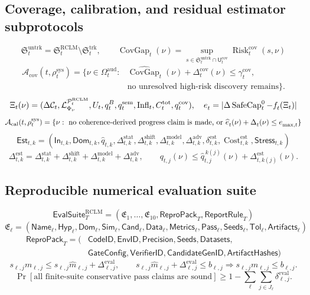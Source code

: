\documentclass[11pt,a4paper]{article}
\newcommand{\Ccal}{\mathcal C}
\newcommand{\Lcal}{\mathcal L}
\newcommand{\Pcal}{\mathcal P}
\newcommand{\Acal}{\mathcal A}
\newcommand{\calib}{\mathrm{cal}}
\newcommand{\adv}{\mathrm{adv}}
\newcommand{\shift}{\mathrm{shift}}
\newcommand{\RCLM}{\mathrm{RCLM}}
\newcommand{\sem}{\mathrm{sem}}
\newcommand{\sys}{\mathrm{sys}}
\newcommand{\aud}{\mathrm{aud}}
\newcommand{\SafeCap}{\operatorname{SafeCap}}
\newcommand{\Risk}{\operatorname{Risk}}
\newcommand{\Cost}{\operatorname{Cost}}
\newcommand{\tot}{\mathrm{tot}}
\newcommand{\eval}{\mathrm{eval}}
\newcommand{\stat}{\mathrm{stat}}
\newcommand{\model}{\mathrm{model}}
\newcommand{\cov}{\mathrm{cov}}
\newcommand{\trk}{\mathrm{trk}}
\newcommand{\untrk}{\mathrm{untrk}}
\newcommand{\est}{\mathrm{est}}
\begin{document}
\subsection*{Coverage, calibration, and residual estimator subprotocols}
\[
\mathfrak S_t^{\untrk}=\mathfrak S_t^{\RCLM}\setminus\mathfrak S_t^{\trk},
\qquad
\operatorname{CovGap}_t(\nu)=
\sup_{s\in\mathfrak S_t^{\untrk}\cap\mathsf U_t^{\cov}}
\Risk_t^{\cov}(s,\nu)
\]
\[
\begin{aligned}
\Acal_{\cov}(t,\rho_t^{\sys})=
\{\nu\in\Omega_t^{\aud}:{}&
\widehat{\operatorname{CovGap}}_t(\nu)+\Delta_t^{\cov}(\nu)
\le\gamma_t^{\cov},\\
&\text{no unresolved high-risk discovery remains}\}.
\end{aligned}
\]
\[
\Xi_t(\nu)=
(\Delta\Ccal_t,\Lcal^{\Pcal_t^{\RCLM}}_{\Phi_\nu},U_t,q_t^B,q_t^{\sem},
\operatorname{Infl}_t,C_t^{\tot},q_t^{\cov}),
\quad
 e_t^{\cal}=|\Delta\SafeCap_t^0-f_t^{\cal}(\Xi_t)|
\]
\[
\Acal_{\calib}(t,\rho_t^{\sys})=
\{\nu:\ \text{no coherence-derived progress claim is made, or } 
\widehat e_t^{\cal}(\nu)+\Delta_t^{\cal}(\nu)\le e_{\max,t}^{\cal}\}
\]
\[
\mathsf{Est}_{t,k}=(\mathsf{In}_{t,k},\mathsf{Dom}_{t,k},\widehat q_{t,k},
\Delta_{t,k}^{\stat},\Delta_{t,k}^{\shift},\Delta_{t,k}^{\model},\Delta_{t,k}^{\adv},
\delta_{t,k}^{\est},\Cost_{t,k}^{\est},\mathsf{Stress}_{t,k})
\]
\[
\Delta_{t,k}^{\est}=\Delta_{t,k}^{\stat}+\Delta_{t,k}^{\shift}+\Delta_{t,k}^{\model}+\Delta_{t,k}^{\adv},
\qquad
q_{t,j}(\nu)\le\widehat q_{t,j}^{\,k(j)}(\nu)+\Delta_{t,k(j)}^{\est}(\nu).
\]


\subsection*{Reproducible numerical evaluation suite}
\[
\mathsf{EvalSuite}^{\RCLM}_T=(\mathfrak E_1,\ldots,\mathfrak E_{10},\mathsf{ReproPack}_T,\mathsf{ReportRule}_T)
\]
\[
\mathfrak E_\ell=(\mathsf{Name}_\ell,\mathsf{Hyp}_\ell,\mathsf{Dom}_\ell,\mathsf{Sim}_\ell,
\mathsf{Cand}_\ell,\mathsf{Data}_\ell,\mathsf{Metrics}_\ell,
\mathsf{Pass}_\ell,\mathsf{Seeds}_\ell,\mathsf{Tol}_\ell,\mathsf{Artifacts}_\ell)
\]
\[
\begin{aligned}
\mathsf{ReproPack}_T=(
&\mathsf{CodeID},\mathsf{EnvID},\mathsf{Precision},\mathsf{Seeds},\mathsf{Datasets},\\
&\mathsf{GateConfig},\mathsf{VerifierID},\mathsf{CandidateGenID},\mathsf{ArtifactHashes})
\end{aligned}
\]
\[
s_{\ell,j}m_{\ell,j}
\le
s_{\ell,j}\widehat m_{\ell,j}+\Delta_{\ell,j}^{\eval},
\qquad
s_{\ell,j}\widehat m_{\ell,j}+\Delta_{\ell,j}^{\eval}\le b_{\ell,j}
\Rightarrow
s_{\ell,j}m_{\ell,j}\le b_{\ell,j}.
\]
\[
\Pr[\text{all finite-suite conservative pass claims are sound}]
\ge
1-\sum_{\ell}\sum_{j\in J_\ell}\delta_{\ell,j}^{\eval}.
\]
\end{document}
